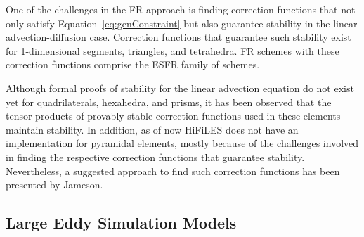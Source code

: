 One of the challenges in the FR approach is finding correction functions that not only satisfy Equation~\eqref{eq:genConstraint} but also guarantee stability in the linear advection-diffusion case. Correction functions that guarantee such stability exist for 1-dimensional segments\cite{vincent2011new}, triangles\cite{castonguay2012new,williams2013tri}, and tetrahedra\cite{williams2013tet}. FR schemes with these correction functions comprise the ESFR family of schemes.

Although formal proofs of stability for the linear advection equation do not exist yet for quadrilaterals, hexahedra, and prisms, it has been observed that the tensor products of provably stable correction functions used in these elements maintain stability. In addition, as of now HiFiLES does not have an implementation for pyramidal elements, mostly because of the challenges involved in finding the respective correction functions that guarantee stability. Nevertheless, a suggested approach to find such correction functions has been presented by Jameson\cite{jameson2011advances}.




\subsection{Large Eddy Simulation Models}\label{lesmodels}

